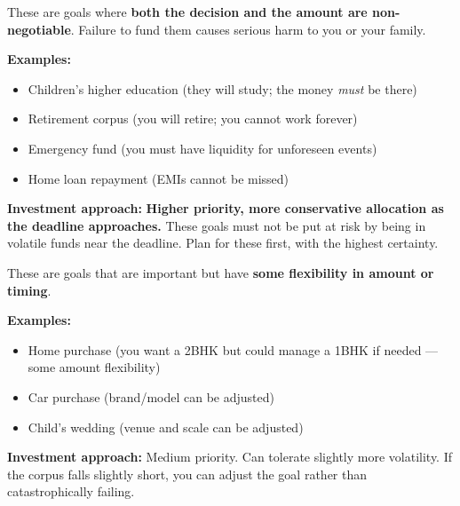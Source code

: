 \documentclass[12pt,a4paper]{article}
\begin{document}
\begin{tcolorbox}[base, colback=AccentRed!8, colframe=AccentRed,
  colbacktitle=AccentRed, coltitle=white, fonttitle=\bfseries,
  title={Priority 1: Must-Have Goals (No Flexibility)}]

These are goals where \textbf{both the decision and the amount are non-negotiable}. Failure to fund them causes serious harm to you or your family.

\medskip
\textbf{Examples:}
\begin{itemize}
  \item Children's higher education (they will study; the money \textit{must} be there)
  \item Retirement corpus (you will retire; you cannot work forever)
  \item Emergency fund (you must have liquidity for unforeseen events)
  \item Home loan repayment (EMIs cannot be missed)
\end{itemize}

\medskip
\textbf{Investment approach:} \textbf{Higher priority, more conservative allocation as the deadline approaches.} These goals must not be put at risk by being in volatile funds near the deadline. Plan for these first, with the highest certainty.
\end{tcolorbox}

\vspace{3mm}

\begin{tcolorbox}[base, colback=AccentGold!12, colframe=AccentGold,
  colbacktitle=AccentGold, coltitle=DarkGray, fonttitle=\bfseries,
  title={Priority 2: Should-Have Goals (Partial Flexibility)}]

These are goals that are important but have \textbf{some flexibility in amount or timing}.

\medskip
\textbf{Examples:}
\begin{itemize}
  \item Home purchase (you want a 2BHK but could manage a 1BHK if needed --- some amount flexibility)
  \item Car purchase (brand/model can be adjusted)
  \item Child's wedding (venue and scale can be adjusted)
\end{itemize}

\medskip
\textbf{Investment approach:} Medium priority. Can tolerate slightly more volatility. If the corpus falls slightly short, you can adjust the goal rather than catastrophically failing.
\end{tcolorbox}
\end{document}
